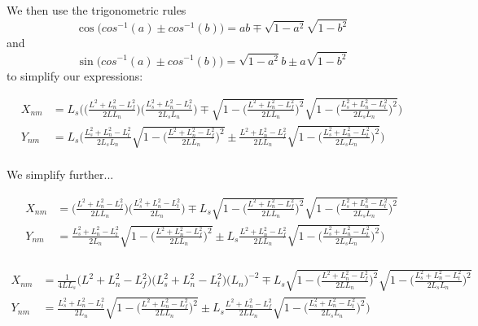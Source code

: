 \documentclass[11pt, landscape]{article}
\begin{document}
We then use the trigonometric rules $$\cos\Big(cos^{-1}(a)\pm
cos^{-1}(b)\Big) = ab \mp \sqrt{1-a^2}\sqrt{1-b^2}$$
and $$\sin\Big(cos^{-1}(a)\pm cos^{-1}(b)\Big) = \sqrt{1-a^2}b\pm a\sqrt{1-b^2}$$ to simplify our expressions:

\begin{align}
  X_{nm} &= L_{s}\Bigg( \Big(\frac{L^2+L_{n}^2-L_{f}^2}{2LL_{n}}\Big)\Big(\frac{L_{s}^2+L_{n}^2-L_{t}^2}{2L_{s}L_{n}}\Big) \mp \sqrt{1-\bigg(\frac{L^2+L_{n}^2-L_{f}^2}{2LL_{n}}\bigg)^2}\sqrt{1-\bigg(\frac{L_{s}^2+L_{n}^2-L_{t}^2}{2L_{s}L_{n}}\bigg)^2} \Bigg)\\
  Y_{nm} &= L_{s}\Bigg(\frac{L_{s}^2+L_{n}^2-L_{t}^2}{2L_{s}L_{n}}\sqrt{1-\bigg(\frac{L^2+L_{n}^2-L_{f}^2}{2LL_{n}}\bigg)^2} \pm \frac{L^2+L_{n}^2-L_{f}^2}{2LL_{n}}\sqrt{1-\bigg(\frac{L_{s}^2+L_{n}^2-L_{t}^2}{2L_{s}L_{n}}\bigg)^2} \Bigg)\\
\end{align}

We simplify further...

\begin{align}
  X_{nm} &= \Big(\frac{L^2+L_{n}^2-L_{f}^2}{2LL_{n}}\Big)\Big(\frac{L_{s}^2+L_{n}^2-L_{t}^2}{2L_{n}}\Big) \mp L_s\sqrt{1-\bigg(\frac{L^2+L_{n}^2-L_{f}^2}{2LL_{n}}\bigg)^2}\sqrt{1-\bigg(\frac{L_{s}^2+L_{n}^2-L_{t}^2}{2L_{s}L_{n}}\bigg)^2}\\
  Y_{nm} &= \frac{L_{s}^2+L_{n}^2-L_{t}^2}{2L_{n}}\sqrt{1-\bigg(\frac{L^2+L_{n}^2-L_{f}^2}{2LL_{n}}\bigg)^2} \pm L_s\frac{L^2+L_{n}^2-L_{f}^2}{2LL_{n}}\sqrt{1-\bigg(\frac{L_{s}^2+L_{n}^2-L_{t}^2}{2L_{s}L_{n}}\bigg)^2} \Bigg)\\
\end{align}

\begin{align}
  X_{nm} &= \frac{1}{4LL_s}\Big(L^2+L_{n}^2-L_{f}^2\Big)\Big(L_{s}^2+L_{n}^2-L_{t}^2\Big)\big(L_n \big)^{-2} \mp L_s\sqrt{1-\bigg(\frac{L^2+L_{n}^2-L_{f}^2}{2LL_{n}}\bigg)^2}\sqrt{1-\bigg(\frac{L_{s}^2+L_{n}^2-L_{t}^2}{2L_{s}L_{n}}\bigg)^2}\\
  Y_{nm} &= \frac{L_{s}^2+L_{n}^2-L_{t}^2}{2L_{n}}\sqrt{1-\bigg(\frac{L^2+L_{n}^2-L_{f}^2}{2LL_{n}}\bigg)^2} \pm L_s\frac{L^2+L_{n}^2-L_{f}^2}{2LL_{n}}\sqrt{1-\bigg(\frac{L_{s}^2+L_{n}^2-L_{t}^2}{2L_{s}L_{n}}\bigg)^2} \Bigg)\\
\end{align}
\end{document}
